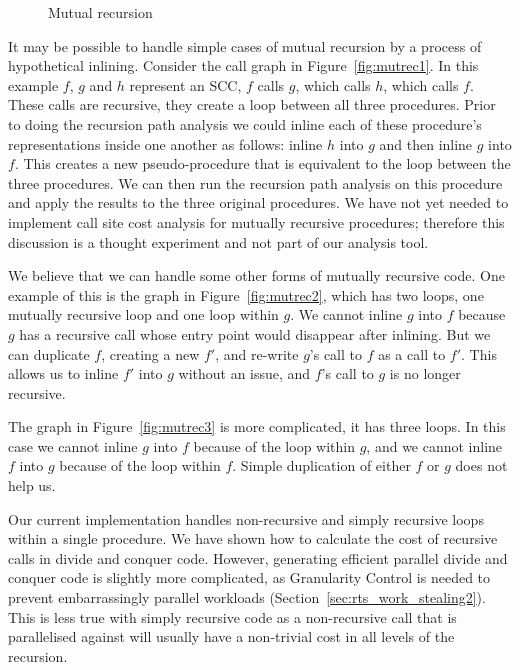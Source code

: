 \begin{figure}
\begin{center}
%
\hspace{0.09\textwidth}
%
%
\hspace{0.09\textwidth}
%
\end{center}
\caption{Mutual recursion}
\label{fig:mutrec}
\end{figure}

It may be possible to handle simple cases of mutual recursion by a process
of hypothetical inlining.
Consider the call graph in Figure~\ref{fig:mutrec1}.
In this example $f$, $g$ and $h$ represent an SCC,
$f$ calls $g$, which calls $h$, which calls $f$.
These calls are recursive, they create a loop between all three procedures.
Prior to doing the recursion path analysis we could inline each of these
procedure's representations inside one another as follows:
inline $h$ into $g$ and then inline $g$ into $f$.
This creates a new pseudo-procedure that is equivalent to the loop between the
three procedures.
We can then run the recursion path analysis on this procedure and apply the
results to the three original procedures.
We have not yet needed to implement call site cost analysis for mutually
recursive procedures;
therefore this discussion is a thought experiment and not part of our
analysis tool.

We believe that we can handle some other forms of mutually recursive code.
One example of this is  the graph in Figure~\ref{fig:mutrec2},
which has two loops, one mutually recursive loop and one loop within $g$.
We cannot inline $g$ into $f$ because $g$ has a recursive call whose
entry point would disappear after inlining.
But we can duplicate $f$, creating a new $f\prime$, and re-write $g$'s call
to $f$ as a call to $f\prime$.
This allows us to inline $f\prime$ into $g$ without an issue, and $f$'s call
to $g$ is no longer recursive.

The graph in Figure~\ref{fig:mutrec3} is more complicated,
it has three loops.
In this case we cannot inline $g$ into $f$ because of the loop within $g$,
and we cannot inline $f$ into $g$ because of the loop within $f$.
Simple duplication of either $f$ or $g$ does not help us.

Our current implementation handles non-recursive and simply recursive
loops within a single procedure.
We have shown how to calculate the cost of recursive calls in divide and
conquer code.
However, generating efficient parallel divide and conquer code is slightly
more complicated,
as Granularity Control is needed to prevent embarrassingly parallel
workloads (Section~\ref{sec:rts_work_stealing2}).
This is less true with simply recursive code as a non-recursive call that is
parallelised against will usually have a non-trivial cost in all levels of
the recursion.

